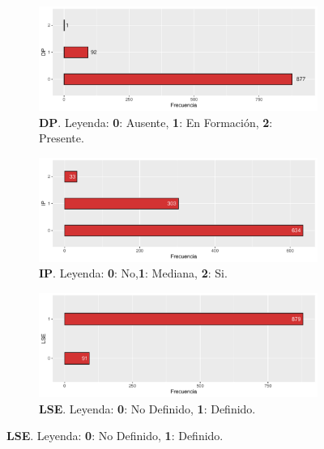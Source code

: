 \begin{figure}[p]
    \ContinuedFloat

    \begin{subfigure}{\textwidth}
        \includegraphics[width=\linewidth]{../../scripts/eda/eda_univar/char_dp_distr.pdf}
        \caption{\textbf{DP}. Leyenda: \textbf{0}: Ausente, \textbf{1}: En Formación, \textbf{2}: Presente.}
        \label{fig4:todd_chars__dp}
    \end{subfigure}

    \begin{subfigure}{\textwidth}
        \includegraphics[width=\linewidth]{../../scripts/eda/eda_univar/char_ip_distr.pdf}
        \caption{\textbf{IP}. Leyenda: \textbf{0}: No,\textbf{1}: Mediana, \textbf{2}: Si.}
        \label{fig4:todd_chars__ip}
    \end{subfigure}

    \begin{subfigure}{\textwidth}
        \includegraphics[width=\linewidth]{../../scripts/eda/eda_univar/char_lse_distr.pdf}
        \caption{\textbf{LSE}. Leyenda: \textbf{0}: No Definido, \textbf{1}: Definido.}
        \label{fig4:todd_chars__lse}
    \end{subfigure}

    \label{fig4:todd_chars}
\end{figure}
